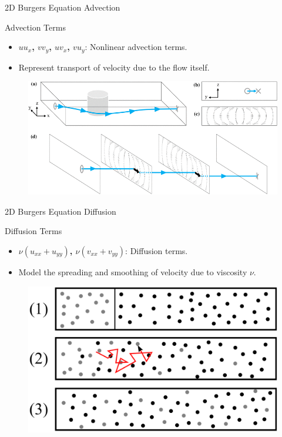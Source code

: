\begin{frame}{2D Burgers Equation}
\small
\textcolor{red_unipd}{\Large Advection}

\vspace{0.6em}

\begin{block}{Advection Terms}
\begin{itemize}
    \item \textbf{$u u_x$, $v v_y$, $u v_x$, $v u_y$}: Nonlinear advection terms.
    \item Represent transport of velocity due to the flow itself.
\end{itemize}
\end{block}

\begin{figure}[h]
    \centering
    \includegraphics[width=0.7\linewidth]{images/advection.png}
\end{figure}

\end{frame}

\begin{frame}{2D Burgers Equation}
\small
\textcolor{red_unipd}{\Large Diffusion}

\vspace{0.6em}

\begin{block}{Diffusion Terms}
\begin{itemize}
    \item \textbf{$\nu (u_{xx} + u_{yy})$, $\nu (v_{xx} + v_{yy})$}: Diffusion terms.
    \item Model the spreading and smoothing of velocity due to viscosity $\nu$.
\end{itemize}
\end{block}

\begin{figure}[h]
    \centering
    \includegraphics[width=0.7\linewidth]{images/diffusion.png}
\end{figure}


\end{frame}


